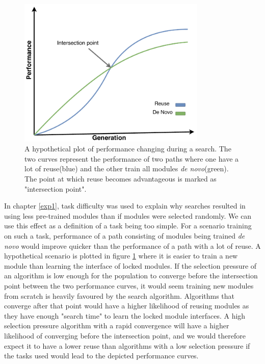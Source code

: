 \begin{figure}[ht]
    \centering
    \includegraphics[width=0.8\textwidth]{Chapters/4.Experiments/exp2/figures/reuse_vs_new.pdf}
    \caption[Hypothetical performance plot]{A hypothetical plot of performance changing during a search. The two curves represent the performance of two paths where one have a lot of reuse(blue) and the other train all modules \textit{de novo}(green). The point at which reuse becomes advantageous is marked as "intersection point".}
    \label{fig:reuse_vs_new}
\end{figure}

In chapter \ref{exp1}, task difficulty was used to explain why searches resulted in using less pre-trained modules than if modules were selected randomly. We can use this effect as a definition of a task being too simple. For a scenario training on such a task, performance of a path consisting of modules being trained \textit{de novo} would improve quicker than the performance of a path with a lot of reuse. A hypothetical scenario is plotted in figure \ref{fig:reuse_vs_new} where it is easier to train a new module than learning the interface of locked modules. If the selection pressure of an algorithm is low enough for the population to converge before the intersection point between the two performance curves, it would seem training new modules from scratch is heavily favoured by the search algorithm. Algorithms that converge after that point would have a higher likelihood of reusing modules as they have enough "search time" to learn the locked module interfaces. A high selection pressure algorithm with a rapid convergence will have a higher likelihood of converging before the intersection point, and we would therefore expect it to have a lower reuse than algorithms with a low selection pressure if the tasks used would lead to the depicted performance curves. 

